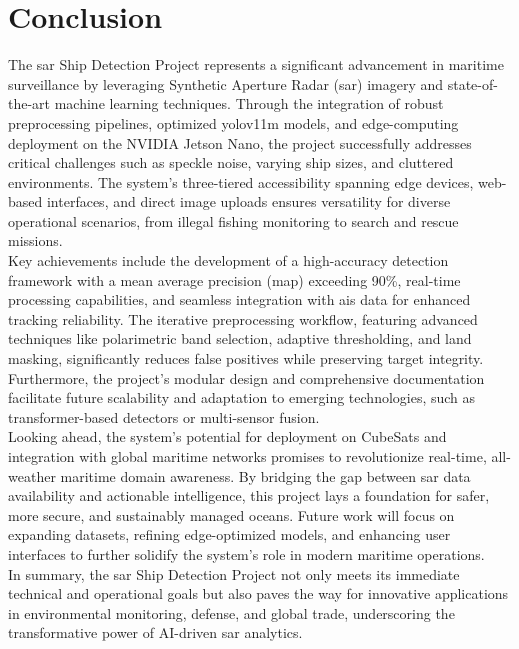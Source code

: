 \documentclass{article}
\begin{document}
\section{Conclusion}
The \acrshort{sar} Ship Detection Project represents a significant advancement in maritime surveillance by leveraging Synthetic Aperture Radar (\acrshort{sar}) imagery and state-of-the-art machine learning techniques. Through the integration of robust preprocessing pipelines, optimized \acrshort{yolov11m} models, and edge-computing deployment on the NVIDIA Jetson Nano, the project successfully addresses critical challenges such as speckle noise, varying ship sizes, and cluttered environments. The system's three-tiered accessibility spanning edge devices, web-based interfaces, and direct image uploads ensures versatility for diverse operational scenarios, from illegal fishing monitoring to search and rescue missions.\\

Key achievements include the development of a high-accuracy detection framework with a mean average precision (\acrshort{map}) exceeding 90\%, real-time processing capabilities, and seamless integration with \acrshort{ais} data for enhanced tracking reliability. The iterative preprocessing workflow, featuring advanced techniques like polarimetric band selection, adaptive thresholding, and land masking, significantly reduces false positives while preserving target integrity. Furthermore, the project's modular design and comprehensive documentation facilitate future scalability and adaptation to emerging technologies, such as transformer-based detectors or multi-sensor fusion.\\

Looking ahead, the system's potential for deployment on CubeSats and integration with global maritime networks promises to revolutionize real-time, all-weather maritime domain awareness. By bridging the gap between \acrshort{sar} data availability and actionable intelligence, this project lays a foundation for safer, more secure, and sustainably managed oceans. Future work will focus on expanding datasets, refining edge-optimized models, and enhancing user interfaces to further solidify the system's role in modern maritime operations.\\

In summary, the \acrshort{sar} Ship Detection Project not only meets its immediate technical and operational goals but also paves the way for innovative applications in environmental monitoring, defense, and global trade, underscoring the transformative power of AI-driven \acrshort{sar} analytics. \newpage

\printglossaries
\newpage
\printbibliography
\end{document}
